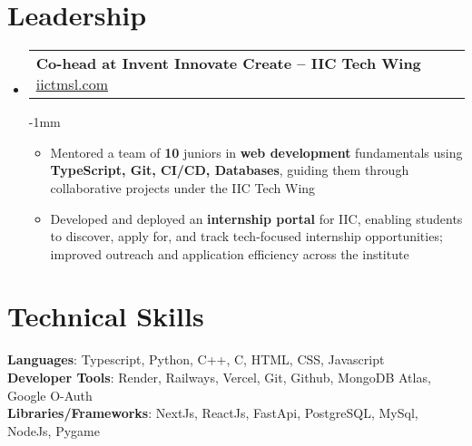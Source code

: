 \documentclass[letterpaper,11pt]{article}
\makeatletter
\newcommand{\resumeItem}[1]{
  \item\small{
    {#1 \vspace{0pt}}
  }
}
\newcommand{\resumeProjectHeading}[2]{
    \item
    \begin{tabular*}{1.001\textwidth}{l@{\extracolsep{\fill}}r}
      \small#1 & \textbf{\small #2}\\
    \end{tabular*}\vspace{-7pt}
}
\newcommand{\resumeSubHeadingListStart}{\begin{itemize}[leftmargin=0.0in, label={}]}
\newcommand{\resumeSubHeadingListEnd}{\end{itemize}}\vspace{0pt}
\newcommand{\resumeItemListStart}{\begin{itemize}}
\newcommand{\resumeItemListEnd}{\end{itemize}\vspace{-5pt}}
\makeatother
\begin{document}
\section{Leadership} 
    \vspace{-10pt}
    \resumeSubHeadingListStart
\resumeProjectHeading
  {\textbf{Co-head at Invent Innovate Create -- IIC Tech Wing} \href{https://www.iictmsl.com}{\color{blue}\underline{iictmsl.com}}}
    
    \vspace{-1mm}
    
          \resumeItemListStart
            \resumeItem{Mentored a team of \textbf{10} juniors in \textbf{web development} fundamentals using \textbf{TypeScript, Git, CI/CD, Databases}, guiding them through collaborative projects under the IIC Tech Wing}

         \resumeItem{Developed and deployed an \textbf{internship portal} for IIC, enabling students to discover, apply for, and track tech-focused internship opportunities; improved outreach and application efficiency across the institute}

          \resumeItemListEnd
          \resumeSubHeadingListEnd
 \vspace{-12pt}
\section{Technical Skills}
 \begin{itemize}[leftmargin=0.15in, label={}]
    \small{\item{   
     \textbf{Languages}{: Typescript, Python, C++, C, HTML, CSS, Javascript} \\[1mm]
     \textbf{Developer Tools}{: Render, Railways, Vercel, Git, Github, MongoDB Atlas, Google O-Auth} \\[1mm]
     \textbf{Libraries/Frameworks}{: NextJs, ReactJs, FastApi, PostgreSQL, MySql, NodeJs, Pygame } \\ [1mm]
    }}
 \end{itemize}
 \vspace{-16pt}
 \vspace{3pt}
\vspace{10pt}

\vspace{-15pt}
\end{document}
